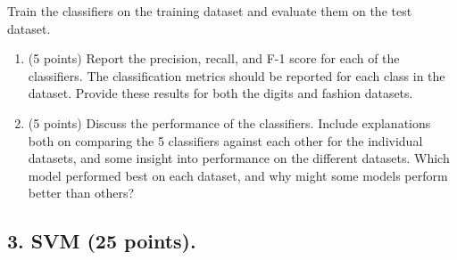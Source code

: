 \documentclass[twoside,10pt]{article}
\begin{document}
Train the classifiers on the training dataset and evaluate them on the test dataset.

\begin{enumerate}

\item (5 points) Report the precision, recall, and F-1 score for each of the classifiers. The classification metrics should be reported for each class in the dataset. Provide these results for both the digits and fashion datasets.

 
\item (5 points) Discuss the performance of the classifiers. Include explanations both on comparing the 5 classifiers against each other for the individual datasets, and some insight into performance on the different datasets. Which model performed best on each dataset, and why might some models perform better than others?

 
\end{enumerate}


\subsection*{3. SVM (25 points).}
\end{document}
